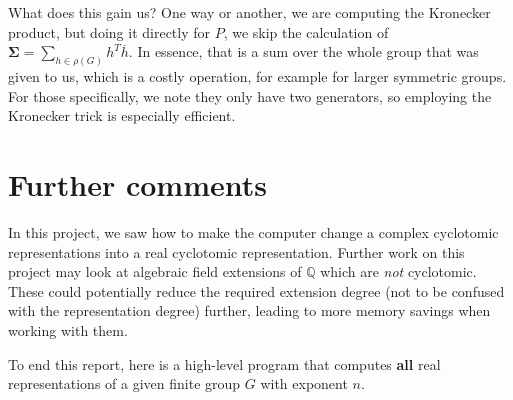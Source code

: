 \documentclass[11pt]{article}
\begin{document}
What does this gain us? One way or another, we are computing the Kronecker product,
but doing it directly for $P$, we skip the calculation of
$\mathbf{\Sigma} = \sum_{h \in \rho(G)} h^T\overline{h}$. In essence, that is a
sum over the whole group that was given to us, which is a costly operation,
for example for larger symmetric groups. For those specifically, we note they only
have two generators, so employing the Kronecker trick is especially efficient.

\newpage

\section{Further comments} \label{sec:end}

In this project, we saw how to make the computer change a complex cyclotomic
representations into a real cyclotomic representation. Further work on this
project may look at algebraic field extensions of $\mathbb{Q}$ which are
\textit{not} cyclotomic. These could potentially reduce the required
extension degree (not to be confused with the representation degree) further,
leading to more memory savings when working with them.

To end this report, here is a high-level program that computes \textbf{all} real
representations of a given finite group $G$ with exponent $n$.
\end{document}
